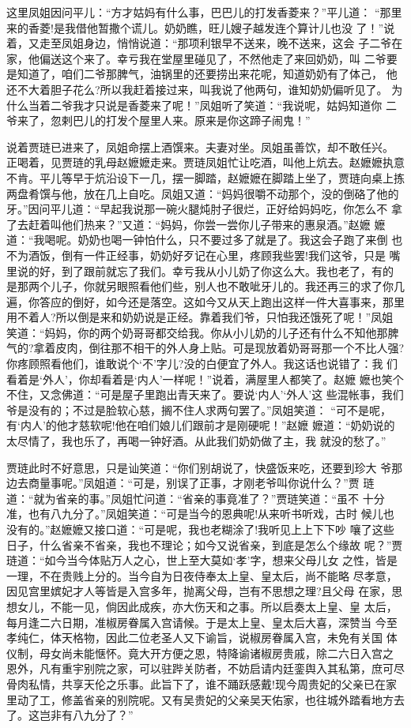 这里凤姐因问平儿：“方才姑妈有什么事，巴巴儿的打发香菱来？”平儿道：
“那里来的香菱!是我借他暂撒个谎儿。奶奶瞧，旺儿嫂子越发连个算计儿也没
了！”说着，又走至凤姐身边，悄悄说道：“那项利银早不送来，晚不送来，这会
子二爷在家，他偏送这个来了。幸亏我在堂屋里碰见了，不然他走了来回奶奶，叫
二爷要是知道了，咱们二爷那脾气，油锅里的还要捞出来花呢，知道奶奶有了体己，
他还不大着胆子花么?所以我赶着接过来，叫我说了他两句，谁知奶奶偏听见了。
为什么当着二爷我才只说是香菱来了呢！”凤姐听了笑道：“我说呢，姑妈知道你
二爷来了，忽剌巴儿的打发个屋里人来。原来是你这蹄子闹鬼！”

说着贾琏已进来了，凤姐命摆上酒馔来。夫妻对坐。凤姐虽善饮，却不敢任兴。
正喝着，见贾琏的乳母赵嬷嬷走来。贾琏凤姐忙让吃酒，叫他上炕去。赵嬷嬷执意
不肯。平儿等早于炕沿设下一几，摆一脚踏，赵嬷嬷在脚踏上坐了，贾琏向桌上拣
两盘肴馔与他，放在几上自吃。凤姐又道：“妈妈很嚼不动那个，没的倒硌了他的
牙。”因问平儿道：“早起我说那一碗火腿炖肘子很烂，正好给妈妈吃，你怎么不
拿了去赶着叫他们热来？”又道：“妈妈，你尝一尝你儿子带来的惠泉酒。”赵嬷
嬷道：“我喝呢。奶奶也喝一钟怕什么，只不要过多了就是了。我这会子跑了来倒
也不为酒饭，倒有一件正经事，奶奶好歹记在心里，疼顾我些罢!我们这爷，只是
嘴里说的好，到了跟前就忘了我们。幸亏我从小儿奶了你这么大。我也老了，有的
是那两个儿子，你就另眼照看他们些，别人也不敢呲牙儿的。我还再三的求了你几
遍，你答应的倒好，如今还是落空。这如今又从天上跑出这样一件大喜事来，那里
用不着人?所以倒是来和奶奶说是正经。靠着我们爷，只怕我还饿死了呢！”凤姐
笑道：“妈妈，你的两个奶哥哥都交给我。你从小儿奶的儿子还有什么不知他那脾
气的?拿着皮肉，倒往那不相干的外人身上贴。可是现放着奶哥哥那一个不比人强?
你疼顾照看他们，谁敢说个‘不’字儿?没的白便宜了外人。我这话也说错了：我
们看着是‘外人’，你却看着是‘内人’一样呢！”说着，满屋里人都笑了。赵嬷
嬷也笑个不住，又念佛道：“可是屋子里跑出青天来了。要说‘内人’‘外人’这
些混帐事，我们爷是没有的；不过是脸软心慈，搁不住人求两句罢了。”凤姐笑道：
“可不是呢，有‘内人’的他才慈软呢!他在咱们娘儿们跟前才是刚硬呢！”赵嬷
嬷道：“奶奶说的太尽情了，我也乐了，再喝一钟好酒。从此我们奶奶做了主，我
就没的愁了。”

贾琏此时不好意思，只是讪笑道：“你们别胡说了，快盛饭来吃，还要到珍大
爷那边去商量事呢。”凤姐道：“可是，别误了正事，才刚老爷叫你说什么？”贾
琏道：“就为省亲的事。”凤姐忙问道：“省亲的事竟准了？”贾琏笑道：“虽不
十分准，也有八九分了。”凤姐笑道：“可是当今的恩典呢!从来听书听戏，古时
候儿也没有的。”赵嬷嬷又接口道：“可是呢，我也老糊涂了!我听见上上下下吵
嚷了这些日子，什么省亲不省亲，我也不理论；如今又说省亲，到底是怎么个缘故
呢？”贾琏道：“如今当今体贴万人之心，世上至大莫如‘孝’字，想来父母儿女
之性，皆是一理，不在贵贱上分的。当今自为日夜侍奉太上皇、皇太后，尚不能略
尽孝意，因见宫里嫔妃才人等皆是入宫多年，抛离父母，岂有不思想之理?且父母
在家，思想女儿，不能一见，倘因此成疾，亦大伤天和之事。所以启奏太上皇、皇
太后，每月逢二六日期，准椒房眷属入宫请候。于是太上皇、皇太后大喜，深赞当
今至孝纯仁，体天格物，因此二位老圣人又下谕旨，说椒房眷属入宫，未免有关国
体仪制，母女尚未能惬怀。竟大开方便之恩，特降谕诸椒房贵戚，除二六日入宫之
恩外，凡有重宇别院之家，可以驻跸关防者，不妨启请内廷銮舆入其私第，庶可尽
骨肉私情，共享天伦之乐事。此旨下了，谁不踊跃感戴!现今周贵妃的父亲已在家
里动了工，修盖省亲的别院呢。又有吴贵妃的父亲吴天佑家，也往城外踏看地方去
了。这岂非有八九分了？”

